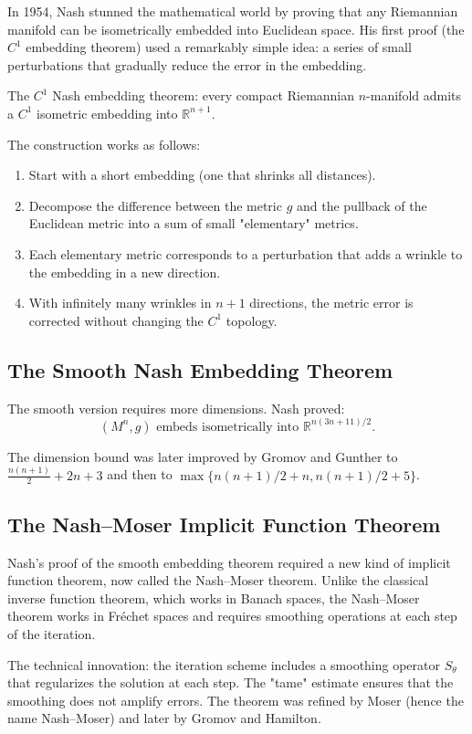 In 1954, Nash stunned the mathematical world by proving that any Riemannian manifold can be isometrically embedded into Euclidean space. His first proof (the $C^1$ embedding theorem) used a remarkably simple idea: a series of small perturbations that gradually reduce the error in the embedding.

The $C^1$ Nash embedding theorem: every compact Riemannian $n$-manifold admits a $C^1$ isometric embedding into $\mathbb{R}^{n+1}$.

The construction works as follows:
\begin{enumerate}
\item Start with a short embedding (one that shrinks all distances).
\item Decompose the difference between the metric $g$ and the pullback of the Euclidean metric into a sum of small "elementary" metrics.
\item Each elementary metric corresponds to a perturbation that adds a wrinkle to the embedding in a new direction.
\item With infinitely many wrinkles in $n+1$ directions, the metric error is corrected without changing the $C^1$ topology.
\end{enumerate}

\subsection{The Smooth Nash Embedding Theorem}

The smooth version requires more dimensions. Nash proved:
\[
(M^n, g) \text{ embeds isometrically into } \mathbb{R}^{n(3n+11)/2}.
\]

The dimension bound was later improved by Gromov and Gunther to $\frac{n(n+1)}{2} + 2n + 3$ and then to $\max\{ n(n+1)/2 + n, n(n+1)/2 + 5 \}$.

\subsection{The Nash--Moser Implicit Function Theorem}

Nash's proof of the smooth embedding theorem required a new kind of implicit function theorem, now called the Nash--Moser theorem. Unlike the classical inverse function theorem, which works in Banach spaces, the Nash--Moser theorem works in Fr\'echet spaces and requires smoothing operations at each step of the iteration.

The technical innovation: the iteration scheme includes a smoothing operator $S_\theta$ that regularizes the solution at each step. The "tame" estimate ensures that the smoothing does not amplify errors. The theorem was refined by Moser (hence the name Nash--Moser) and later by Gromov and Hamilton.

